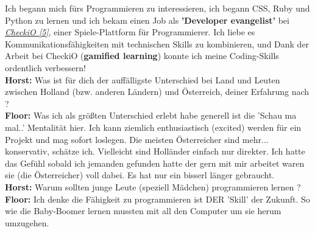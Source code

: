 \documentclass[10pt,a4paper,ngerman,twoside]{article} %
\begin{document}
Ich begann mich fürs Programmieren zu interessieren, ich begann CSS, Ruby und Python zu lernen und ich bekam einen Job als \textbf{'Developer evangelist'} bei \href{http://www.checkio.org/}{\textit{CheckiO [5]}}, einer Spiele-Plattform für Programmierer. Ich liebe es Kommunikationsfähigkeiten mit technischen Skills zu kombinieren, und Dank der Arbeit bei CheckiO (\textbf{gamified learning}) konnte ich meine Coding-Skills ordentlich verbessern! \\
\textbf{Horst:} Was ist für dich der auffälligste Unterschied bei Land und Leuten zwischen Holland (bzw. anderen Ländern) und Österreich, deiner Erfahrung nach ? \\
\textbf{Floor:} Was ich als größten Unterschied erlebt habe generell ist die 'Schau ma mal..' Mentalität hier. Ich kann ziemlich enthusiastisch (excited) werden für ein Projekt und mag sofort loslegen. Die meisten Österreicher sind mehr... konservativ, schätze ich. Vielleicht sind Holländer einfach nur direkter. Ich hatte das Gefühl sobald ich jemanden gefunden hatte der gern mit mir arbeitet waren sie (die Österreicher) voll dabei. Es hat nur ein bisserl länger gebraucht. \\
\textbf{Horst:} Warum sollten junge Leute (speziell Mädchen) programmieren lernen ? \\
\textbf{Floor:} Ich denke die Fähigkeit zu programmieren ist DER 'Skill' der Zukunft. So wie die Baby-Boomer lernen mussten mit all den Computer um sie herum umzugehen. 
\end{document}
